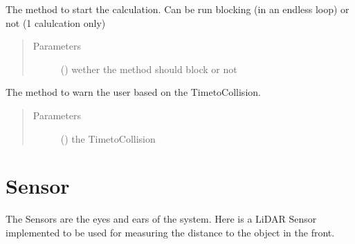 \documentclass[letterpaper,10pt,english]{sphinxmanual}
\begin{document}
\begin{fulllineitems}
\begin{fulllineitems}
\end{fulllineitems}


\begin{fulllineitems}
\label{\detokenize{no_collide:lib.nocollide.NoCollide.run}}
The method to start the calculation. Can be run blocking (in an endless loop) or not (1 calulcation only)
\begin{quote}\begin{description}
\item[{Parameters}] \leavevmode
{} () \textendash{} wether the method should block or not

\end{description}\end{quote}

\end{fulllineitems}


\begin{fulllineitems}
\label{\detokenize{no_collide:lib.nocollide.NoCollide.warn}}
The method to warn the user based on the Time\sphinxhyphen{}to\sphinxhyphen{}Collision.
\begin{quote}\begin{description}
\item[{Parameters}] \leavevmode
{} () \textendash{} the Time\sphinxhyphen{}to\sphinxhyphen{}Collision

\end{description}\end{quote}

\end{fulllineitems}


\end{fulllineitems}


\ignorespaces 

\chapter{Sensor}
\label{\detokenize{sensor:sensor}}\label{\detokenize{sensor:index-0}}\label{\detokenize{sensor::doc}}
The Sensors are the eyes and ears of the system. Here is a LiDAR Sensor implemented to be used for measuring the distance
to the object in the front.
\end{document}
